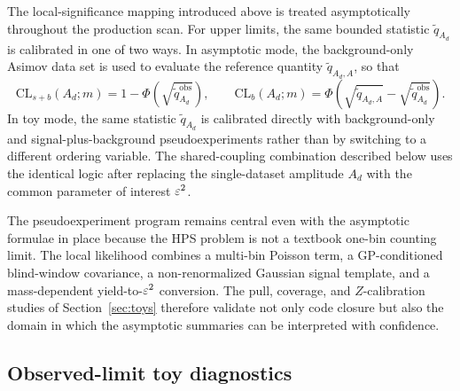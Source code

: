 The local-significance mapping introduced above is treated asymptotically throughout
the production scan. For upper limits, the same bounded statistic
$\tilde q_{A_d}$ is calibrated in one of two ways. In asymptotic mode, the
background-only Asimov data set is used to evaluate the reference quantity
$\tilde q_{A_d,A}$, so that
\begin{equation}
\mathrm{CL}_{s+b}(A_d;m)
=
1-\Phi\!\left(\sqrt{\tilde q_{A_d}^{\mathrm{obs}}}\right),
\qquad
\mathrm{CL}_{b}(A_d;m)
=
\Phi\!\left(
\sqrt{\tilde q_{A_d,A}}-\sqrt{\tilde q_{A_d}^{\mathrm{obs}}}
\right).
\label{eq:cls-asymptotic}
\end{equation}
In toy mode, the same statistic $\tilde q_{A_d}$ is calibrated directly with
background-only and signal-plus-background pseudoexperiments rather than by switching
to a different ordering variable. The shared-coupling combination described below uses
the identical logic after replacing the single-dataset amplitude $A_d$ with the common
parameter of interest $\varepsilon^2$.

The pseudoexperiment program remains central even with the asymptotic formulae in
place because the HPS problem is not a textbook one-bin counting limit. The local
likelihood combines a multi-bin Poisson term, a GP-conditioned blind-window
covariance, a non-renormalized Gaussian signal template, and a mass-dependent
yield-to-$\varepsilon^2$ conversion. The pull, coverage, and $Z$-calibration studies of
Section~\ref{sec:toys} therefore validate not only code closure but also the domain in
which the asymptotic summaries can be interpreted with confidence.

\subsection{Observed-limit toy diagnostics}

